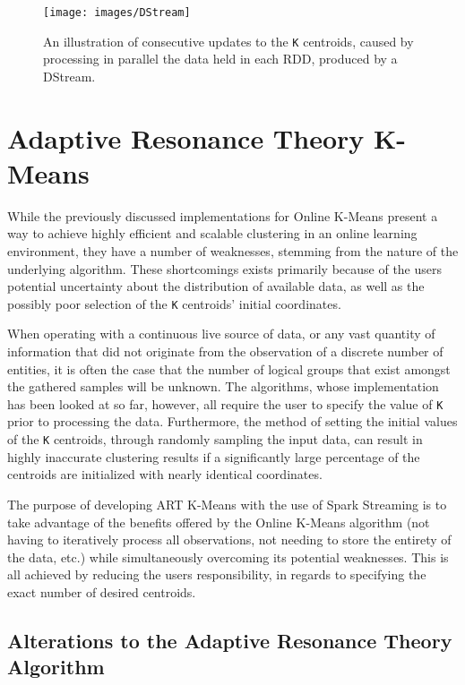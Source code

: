 \documentclass{l4proj}
\begin{document}
\begin{figure}[H]
	\centering
    \texttt{[image: images/DStream]}
    \caption{An illustration of consecutive updates to the \texttt{K} centroids, caused by processing in parallel the data held in each RDD, produced by a DStream.}
    \label{DStream}
\end{figure}


\chapter{Adaptive Resonance Theory K-Means}
\label{art}

While the previously discussed implementations for Online K-Means present a way to achieve highly efficient and scalable clustering in an online learning environment, they have a number of weaknesses, stemming from the nature of the underlying algorithm. These shortcomings exists primarily because of the users potential uncertainty about the distribution of available data, as well as the possibly poor selection of the \texttt{K} centroids' initial coordinates.

When operating with a continuous live source of data, or any vast quantity of information that did not originate from the observation of a discrete number of entities, it is often the case that the number of logical groups that exist amongst the gathered samples will be unknown. The algorithms, whose implementation has been looked at so far, however, all require the user to specify the value of \texttt{K} prior to processing the data. Furthermore, the method of setting the initial values of the \texttt{K} centroids, through randomly sampling the input data, can result in highly inaccurate clustering results if a significantly large percentage of the centroids are  initialized with nearly identical coordinates\cite{PlusPlus}.

The purpose of developing ART K-Means with the use of Spark Streaming is to take advantage of the benefits offered by the Online K-Means algorithm (not having to iteratively process all observations, not needing to store the entirety of the data, etc.) while simultaneously overcoming its potential weaknesses. This is all achieved by reducing the users responsibility, in regards to specifying the exact number of desired centroids.

\section{Alterations to the Adaptive Resonance Theory Algorithm}
\end{document}
